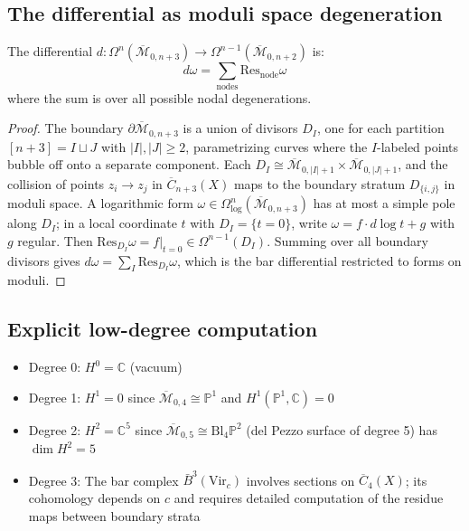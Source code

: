 \subsection{The differential as moduli space degeneration}
 
\begin{proposition}
\label{prop:moduli-degeneration}
The differential $d: \Omega^n(\overline{\mathcal{M}}_{0,n+3}) \to \Omega^{n-1}(\overline{\mathcal{M}}_{0,n+2})$ is:
\[
d\omega = \sum_{\text{nodes}} \text{Res}_{\text{node}} \omega
\]
where the sum is over all possible nodal degenerations.
\end{proposition}
 
\begin{proof}
The boundary $\partial\overline{\mathcal{M}}_{0,n+3}$ is a union of divisors $D_I$, one for each partition $[n+3] = I \sqcup J$ with $|I|, |J| \geq 2$, parametrizing curves where the $I$-labeled points bubble off onto a separate component.  Each $D_I \cong \overline{\mathcal{M}}_{0,|I|+1} \times \overline{\mathcal{M}}_{0,|J|+1}$, and the collision of points $z_i \to z_j$ in $\overline{C}_{n+3}(X)$ maps to the boundary stratum $D_{\{i,j\}}$ in moduli space.  A logarithmic form $\omega \in \Omega^n_{\log}(\overline{\mathcal{M}}_{0,n+3})$ has at most a simple pole along $D_I$; in a local coordinate $t$ with $D_I = \{t = 0\}$, write $\omega = f \cdot d\log t + g$ with $g$ regular.  Then $\mathrm{Res}_{D_I}\omega = f|_{t=0} \in \Omega^{n-1}(D_I)$.  Summing over all boundary divisors gives $d\omega = \sum_I \mathrm{Res}_{D_I}\omega$, which is the bar differential restricted to forms on moduli.
\end{proof}
 
\subsection{Explicit low-degree computation}
 
\begin{example}
\begin{itemize}
\item Degree 0: $H^0 = \mathbb{C}$ (vacuum)
\item Degree 1: $H^1 = 0$ since $\overline{\mathcal{M}}_{0,4} \cong \mathbb{P}^1$ and $H^1(\mathbb{P}^1, \mathbb{C}) = 0$
\item Degree 2: $H^2 = \mathbb{C}^5$ since $\overline{\mathcal{M}}_{0,5} \cong \text{Bl}_4\mathbb{P}^2$ (del Pezzo surface of degree 5) has $\dim H^2 = 5$
\item Degree 3: The bar complex $\bar{B}^3(\mathrm{Vir}_c)$ involves sections on $\overline{C}_4(X)$; its cohomology depends on $c$ and requires detailed computation of the residue maps between boundary strata
\end{itemize}
\end{example}
 
